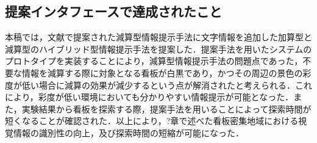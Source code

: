 \subsection{提案インタフェースで達成されたこと}
  本稿では，文献\cite{Fujita:2013}で提案された減算型情報提示手法に文字情報を追加した加算型と減算型のハイブリッド型情報提示手法を提案した．提案手法を用いたシステムのプロトタイプを実装することにより，減算型情報提示手法の問題点であった，不要な情報を減算する際に対象となる看板が白黒であり，かつその周辺の景色の彩度が低い場合に減算の効果が減少するという点が解消されたと考えられる．これにより，彩度が低い環境においても分かりやすい情報提示が可能となった．また，実験結果から看板を探索する際，提案手法を用いることによって探索時間が短くなることが確認された．以上により，?章で述べた看板密集地域における視覚情報の識別性の向上，及び探索時間の短縮が可能になった．
